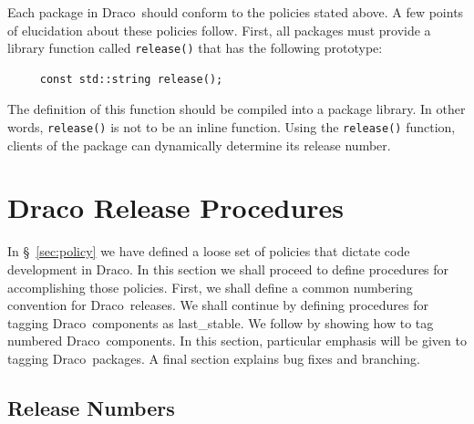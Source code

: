 \documentclass[11pt]{nmemo}
\newcommand{\draco}{{\normalfont\normalsize\sffamily Draco}}
\newcommand{\stable}{{\normalfont\normalsize\ttfamily last\_stable}}
\begin{document}
Each package in \draco\ should conform to the policies stated above.
A few points of elucidation about these policies follow.  First, all 
packages must provide a library function called \texttt{release()}
that has the following prototype:
\begin{verbatim}
     const std::string release();
\end{verbatim}
The definition of this function should be compiled into a package
library.  In other words, \texttt{release()} is not to be an inline
function.  Using the \texttt{release()} function, clients of the
package can dynamically determine its release number.  


\section{Draco Release Procedures}
\label{sec:procedures}

In \S~\ref{sec:policy} we have defined a loose set of policies that
dictate code development in \draco.  In this section we shall proceed
to define procedures for accomplishing those policies.  First, we
shall define a common numbering convention for \draco\ releases.  We
shall continue by defining procedures for tagging \draco\ components
as \stable.  We follow by showing how to tag numbered \draco\ 
components.  In this section, particular emphasis will be given to
tagging \draco\ packages.  A final section explains bug fixes and
branching.

\subsection{Release Numbers}
\label{sec:rel_num}
\end{document}
